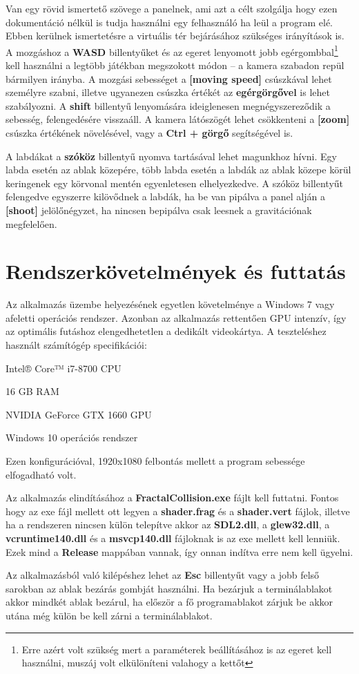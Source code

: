 Van egy rövid ismertető szövege a panelnek, ami azt a célt szolgálja hogy ezen dokumentáció nélkül is tudja használni egy felhasználó ha leül a program elé. Ebben kerülnek ismertetésre a virtuális tér bejárásához szükséges irányítások is. A mozgáshoz a \textbf{WASD} billentyűket és az egeret lenyomott jobb egérgombbal\footnote{Erre azért volt szükség mert a paraméterek beállításához is az egeret kell használni, muszáj volt elkülöníteni valahogy a kettőt} kell használni a legtöbb játékban megszokott módon -- a kamera szabadon repül bármilyen irányba. A mozgási sebességet a \textbf{[moving speed]} csúszkával lehet személyre szabni, illetve ugyanezen csúszka értékét az \textbf{egérgörgővel} is lehet szabályozni. A \textbf{shift} billentyű lenyomására ideiglenesen megnégyszereződik a sebesség, felengedésére visszaáll. A kamera látószögét lehet csökkenteni a \textbf{[zoom]} csúszka értékének növelésével, vagy a \textbf{Ctrl + görgő} segítségével is.

A labdákat a \textbf{szóköz} billentyű nyomva tartásával lehet magunkhoz hívni. Egy labda esetén az ablak közepére, több labda esetén a labdák az ablak közepe körül keringenek egy körvonal mentén egyenletesen elhelyezkedve. A szóköz billentyűt felengedve egyszerre kilövődnek a labdák, ha be van pipálva a panel alján a \textbf{[shoot]} jelölőnégyzet, ha nincsen bepipálva csak leesnek a gravitációnak megfelelően.
 
\cleardoublepage
\section{Rendszerkövetelmények és futtatás} 
\label{sec:futtatas} 
Az alkalmazás üzembe helyezésének egyetlen követelménye a Windows 7 vagy afeletti operációs rendszer. Azonban az alkalmazás rettentően GPU intenzív, így az optimális futáshoz elengedhetetlen a dedikált videokártya. A teszteléshez használt számítógép specifikációi:
\begin{compactitem}
	\item Intel® Core™ i7-8700 CPU
	\item 16 GB RAM
	\item NVIDIA GeForce GTX 1660 GPU
	\item Windows 10 operációs rendszer
\end{compactitem}
Ezen konfigurációval, 1920x1080 felbontás mellett a program sebessége elfogadható volt.

Az alkalmazás elindításához a \textbf{FractalCollision.exe} fájlt kell futtatni. Fontos hogy az exe fájl mellett ott legyen a \textbf{shader.frag} és a \textbf{shader.vert} fájlok, illetve ha a rendszeren nincsen külön telepítve akkor az \textbf{SDL2.dll}, a \textbf{glew32.dll}, a \textbf{vcruntime140.dll} és a \textbf{msvcp140.dll} fájloknak is az exe mellett kell lenniük. Ezek mind a \textbf{Release} mappában vannak, így onnan indítva erre nem kell ügyelni.

Az alkalmazásból való kilépéshez lehet az \textbf{Esc} billentyűt vagy a jobb felső sarokban az ablak bezárás gombját használni. Ha bezárjuk a terminálablakot akkor mindkét ablak bezárul, ha először a fő programablakot zárjuk be akkor utána még külön be kell zárni a terminálablakot.


